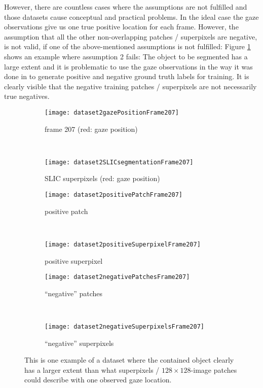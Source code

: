 However, there are countless cases where the assumptions are not fulfilled and those datasets cause conceptual and practical problems. 
In the ideal case the gaze observations give us one true positive location for each frame. 
However, the assumption that all the other non-overlapping patches / superpixels are negative, is not valid, if one of the above-mentioned assumptions is not fulfilled: 
Figure \ref{fig:nonValidAssumptionD2} shows an example where assumption 2 fails: The object to be segmented has a large extent and it is problematic to use the gaze observations in the way it was done in \cite{vilarino2007automatic} to generate positive and negative ground truth labels for training. It is clearly visible that the negative training patches / superpixels are not necessarily true negatives.

\begin{figure}[ht]
	\centering
	\begin{subfigure}[h]{0.48\textwidth}
		\texttt{[image: dataset2gazePositionFrame207]}
		\caption*{frame 207 (red: gaze position)}
	\end{subfigure}
	~
	\begin{subfigure}[h]{0.48\textwidth}
	    \texttt{[image: dataset2SLICsegmentationFrame207]}
	    \caption*{SLIC superpixels (red: gaze position)}
	\end{subfigure}
	
	\vspace{3mm}
	\begin{subfigure}[h]{0.31\textwidth}
		\texttt{[image: dataset2positivePatchFrame207]}	
		\caption*{positive patch}
	\end{subfigure}
	~
	\begin{subfigure}[h]{0.31\textwidth}
		\texttt{[image: dataset2positiveSuperpixelFrame207]}	
		\caption*{positive superpixel}
	\end{subfigure}
	
	\vspace{3mm}
		\begin{subfigure}[h]{0.48\textwidth}
		\texttt{[image: dataset2negativePatchesFrame207]}	
		\caption*{``negative'' patches}
	\end{subfigure}
	~
	\begin{subfigure}[h]{0.48\textwidth}
		\texttt{[image: dataset2negativeSuperpixelsFrame207]}	
		\caption*{``negative'' superpixels}
	\end{subfigure}	
	\caption{This is one example of a dataset where the contained object clearly has a larger extent than what superpixels / $128 \times 128$-image patches could describe with one observed gaze location.}
	\label{fig:nonValidAssumptionD2}
\end{figure}


